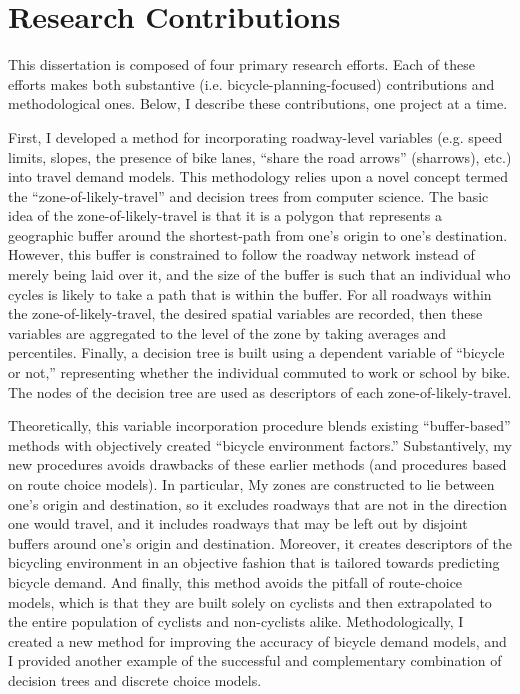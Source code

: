 \section{Research Contributions}
This dissertation is composed of four primary research efforts. Each of these efforts makes both substantive (i.e. bicycle-planning-focused) contributions and methodological ones. Below, I describe these contributions, one project at a time.

First, I developed a method for incorporating roadway-level variables (e.g. speed limits, slopes, the presence of bike lanes, ``share the road arrows'' (sharrows), etc.) into travel demand models. This methodology relies upon a novel concept termed the ``zone-of-likely-travel'' and decision trees from computer science. The basic idea of the zone-of-likely-travel is that it is a polygon that represents a geographic buffer around the shortest-path from one's origin to one's destination. However, this buffer is constrained to follow the roadway network instead of merely being laid over it, and the size of the buffer is such that an individual who cycles is likely to take a path that is within the buffer. For all roadways within the zone-of-likely-travel, the desired spatial variables are recorded, then these variables are aggregated to the level of the zone by taking averages and percentiles. Finally, a decision tree is built using a dependent variable of ``bicycle or not,'' representing whether the individual commuted to work or school by bike. The nodes of the decision tree are used as descriptors of each zone-of-likely-travel.

Theoretically, this variable incorporation procedure blends existing ``buffer-based'' methods with objectively created ``bicycle environment factors.'' Substantively, my new procedures avoids drawbacks of these earlier methods (and procedures based on route choice models). In particular, My zones are constructed to lie between one's origin and destination, so it excludes roadways that are not in the direction one would travel, and it includes roadways that may be left out by disjoint buffers around one's origin and destination. Moreover, it creates descriptors of the bicycling environment in an objective fashion that is tailored towards predicting bicycle demand. And finally, this method avoids the pitfall of route-choice models, which is that they are built solely on cyclists and then extrapolated to the entire population of cyclists and non-cyclists alike. Methodologically, I created a new method for improving the accuracy of bicycle demand models, and I provided another example of the successful and complementary combination of decision trees and discrete choice models.

